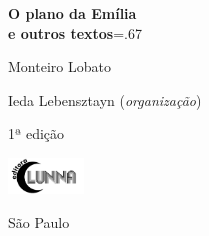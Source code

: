 




\begingroup\thispagestyle{empty}\vspace*{-.01\textheight}\parindent=0pt 
              \formular
              \Huge 
              \textbf{O plano da Emília\\ e outros textos}\baselineskip=.67\baselineskip 

              \vspace{15mm}
              
              \LARGE
              Monteiro Lobato
              
              \vspace{5cm}

              \newfontfamily{}
              {\selectfont\minion\small
              Ieda Lebensztayn (\textit{organização})}
              
              {\selectfont\minion\footnotesize
              1ª edição}
                    
              \vfill

              \includegraphics[width=2cm]{../logolunna.png}

              {\selectfont\minion\small
              São Paulo \quad\the\year}
\endgroup

\pagebreak